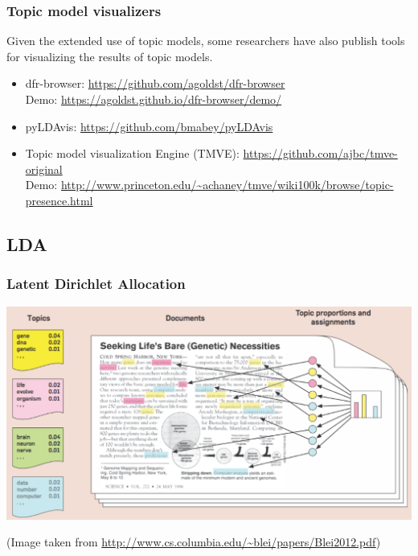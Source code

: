 \documentclass{beamer}
\begin{document}
\begin{frame}

    \frametitle{Topic model visualizers}

	Given the extended use of topic models, some researchers have also publish tools for visualizing the results of topic models.

    \begin{itemize}
  
    	\item dfr-browser: \url{https://github.com/agoldst/dfr-browser} \\
    	Demo: \url{https://agoldst.github.io/dfr-browser/demo/}
    	
    	\item pyLDAvis: \url{https://github.com/bmabey/pyLDAvis} \\
    	
    	\item Topic model visualization Engine (TMVE): \url{https://github.com/ajbc/tmve-original} \\
    	Demo: \url{http://www.princeton.edu/~achaney/tmve/wiki100k/browse/topic-presence.html} 
    
    \end{itemize}

\end{frame}


\subsection{LDA}

\begin{frame}

    \frametitle{Latent Dirichlet Allocation}

	\centerline{\includegraphics[width=\textwidth]{./figs/NLPTM_LDA.png}}
(Image taken from \url{http://www.cs.columbia.edu/~blei/papers/Blei2012.pdf})

\end{frame}
\end{document}
